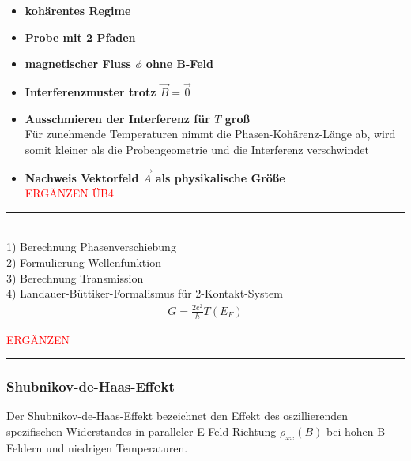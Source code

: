 \documentclass{article}
\begin{document}
	\begin{itemize}
		\item \textbf{kohärentes Regime}
				
		
		\item \textbf{Probe mit 2 Pfaden}


		\item \textbf{magnetischer Fluss $\phi$ ohne B-Feld}		
	\end{itemize}

	\begin{itemize}
		\item \textbf{Interferenzmuster trotz $\vec{B}=\vec{0}$}
		
		
		\item \textbf{Ausschmieren der Interferenz für $T$ groß} \\
		Für zunehmende Temperaturen nimmt die Phasen-Kohärenz-Länge ab, wird somit kleiner als die Probengeometrie und die Interferenz verschwindet
	\end{itemize}


	\begin{itemize}
		\item \textbf{Nachweis Vektorfeld $\vec{A}$ als physikalische Größe}\\
		\textcolor{red}{ERGÄNZEN ÜB4}
	\end{itemize}


\newpage


{\color{violet}
\hrule
	 \\
	1) Berechnung Phasenverschiebung \\
	2) Formulierung Wellenfunktion \\
	3) Berechnung Transmission \\
	4) Landauer-Büttiker-Formalismus für 2-Kontakt-System
		\begin{align*}
			G = \frac{2e^2}{h} T(E_F)
		\end{align*}
	
	
	\textcolor{red}{ERGÄNZEN}
\hrule
}


\newpage


\subsubsection{Shubnikov-de-Haas-Effekt}
Der Shubnikov-de-Haas-Effekt bezeichnet den Effekt des oszillierenden spezifischen Widerstandes in paralleler E-Feld-Richtung $\rho_{xx}(B)$ bei hohen B-Feldern und niedrigen Temperaturen.
\end{document}
